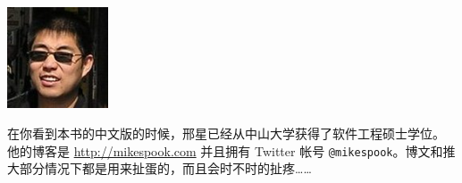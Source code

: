 \includegraphics[width=3cm]{fig/avatar-xingx-128x128}

在你看到本书的中文版的时候，邢星已经从中山大学获得了软件工程硕士学位。
他的博客是 \url{http://mikespook.com} 并且拥有 Twitter 帐号
\texttt{@mikespook}。博文和推大部分情况下都是用来扯蛋的，而且会时不时的扯疼……
